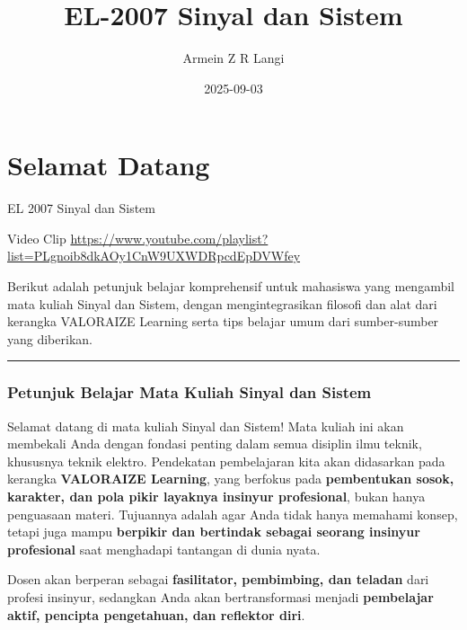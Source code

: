 \documentclass[
  letterpaper,
  DIV=11,
  numbers=noendperiod]{scrreprt}
\title{EL-2007 Sinyal dan Sistem}
\author{Armein Z R Langi}
\date{2025-09-03}
\renewcommand*\contentsname{Table of contents}
\newcommand\contentsname{Table of contents}
\begin{document}
\maketitle

\renewcommand*\contentsname{Table of contents}
{
\hypersetup{linkcolor=}
\setcounter{tocdepth}{2}
\tableofcontents
}


\chapter*{Selamat Datang}\label{selamat-datang}


EL 2007 Sinyal dan Sistem

Video Clip
\url{https://www.youtube.com/playlist?list=PLgnoib8dkAOy1CnW9UXWDRpcdEpDVWfey}

Berikut adalah petunjuk belajar komprehensif untuk mahasiswa yang
mengambil mata kuliah Sinyal dan Sistem, dengan mengintegrasikan
filosofi dan alat dari kerangka VALORAIZE Learning serta tips belajar
umum dari sumber-sumber yang diberikan.

\begin{center}\rule{0.5\linewidth}{0.5pt}\end{center}

\subsection*{\texorpdfstring{\textbf{Petunjuk Belajar Mata Kuliah Sinyal
dan
Sistem}}{Petunjuk Belajar Mata Kuliah Sinyal dan Sistem}}\label{petunjuk-belajar-mata-kuliah-sinyal-dan-sistem}

Selamat datang di mata kuliah Sinyal dan Sistem! Mata kuliah ini akan
membekali Anda dengan fondasi penting dalam semua disiplin ilmu teknik,
khususnya teknik elektro. Pendekatan pembelajaran kita akan didasarkan
pada kerangka \textbf{VALORAIZE Learning}, yang berfokus pada
\textbf{pembentukan sosok, karakter, dan pola pikir layaknya insinyur
profesional}, bukan hanya penguasaan materi. Tujuannya adalah agar Anda
tidak hanya memahami konsep, tetapi juga mampu \textbf{berpikir dan
bertindak sebagai seorang insinyur profesional} saat menghadapi
tantangan di dunia nyata.

Dosen akan berperan sebagai \textbf{fasilitator, pembimbing, dan
teladan} dari profesi insinyur, sedangkan Anda akan bertransformasi
menjadi \textbf{pembelajar aktif, pencipta pengetahuan, dan reflektor
diri}.
\end{document}

